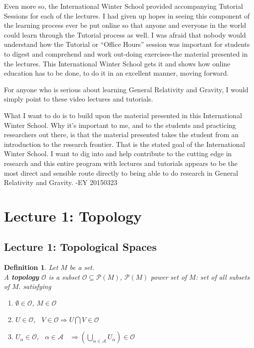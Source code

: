 \documentclass[10pt]{amsart}
\newtheorem{definition}{Definition}
\begin{document}
\begin{multicols*}{2}
Even more so, the International Winter School provided accompanying Tutorial Sessions for each of the lectures.  I had given up hopes in seeing this component of the learning process ever be put online so that anyone and everyone in the world could learn through the Tutorial process as well.  I was afraid that nobody would understand how the Tutorial or ``Office Hours'' session was important for students to digest and comprehend and work out-doing exercises-the material presented in the lectures.  This International Winter School gets it and shows how online education has to be done, to do it in an excellent manner, moving forward.  

For anyone who is serious about learning General Relativity and Gravity, I would simply point to these video lectures and tutorials.  

What I want to do is to build upon the material presented in this International Winter School.  Why it's important to me, and to the students and practicing researchers out there, is that the material presented takes the student from an introduction to the research frontier.  That is the stated goal of the International Winter School.  I want to dig into and help contribute to the cutting edge in research and this entire program with lectures and tutorials appears to be the most direct and sensible route directly to being able to do research in General Relativity and Gravity. -EY 20150323


\section{Lecture 1: Topology}

\subsection{Lecture 1: Topological Spaces}

\begin{definition}
	Let $M$ be a set.  \\
	A \textbf{topology} $\mathcal{O}$ is a subset $\mathcal{O} \subseteq \mathcal{P}(M)$, $\mathcal{P}(M)$ power set of $M$: set of all subsets of $M$. satisfying
	\begin{enumerate}
		\item[(i)] $\emptyset \in \mathcal{O}$, $M \in \mathcal{O}$ 
		\item[(ii)] $ U \in \mathcal{O}$, \, $V \in \mathcal{O} \Longrightarrow U\bigcap V \in \mathcal{O}$ 
		\item[(iii)] $U_{\alpha} \in \mathcal{O}$, \, $\alpha \in \mathcal{A}$ \, $\Longrightarrow \left( \bigcup_{\alpha \in \mathcal{A}} U_{\alpha} \right) \in \mathcal{O}$
	\end{enumerate}
\end{definition}


\end{multicols*}
\end{document}
